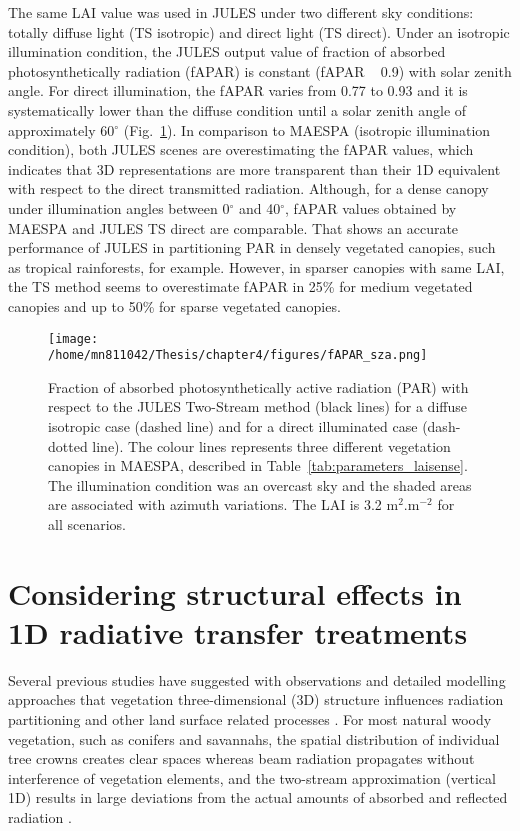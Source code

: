 The same LAI value was used in JULES under two different sky conditions: totally diffuse light (TS isotropic) and direct light (TS direct). Under an isotropic illumination condition, the JULES output value of fraction of absorbed photosynthetically radiation (fAPAR) is constant (fAPAR ~ 0.9) with solar zenith angle. For direct illumination, the fAPAR varies from 0.77 to 0.93 and it is systematically lower than the diffuse condition until a solar zenith angle of approximately 60$^{\circ}$ (Fig.~\ref{f:ts_maespa}). In comparison to MAESPA (isotropic illumination condition), both JULES scenes are overestimating the fAPAR values, which indicates that 3D representations are more transparent than their 1D equivalent with respect to the direct transmitted radiation. Although, for a dense canopy under illumination angles between 0$^{\circ}$ and 40$^{\circ}$, fAPAR values obtained by MAESPA and JULES TS direct are comparable. That shows an accurate performance of JULES in partitioning PAR in densely vegetated canopies, such as tropical rainforests, for example. However, in sparser canopies with same LAI, the TS method seems to overestimate fAPAR in 25\% for medium vegetated canopies and up to 50\% for sparse vegetated canopies. 

\begin{figure}
\centering
\texttt{[image: /home/mn811042/Thesis/chapter4/figures/fAPAR\_sza.png]}
\caption{Fraction of absorbed photosynthetically active radiation (PAR) with respect to the JULES Two-Stream method (black lines) for a diffuse isotropic case (dashed line) and for a direct illuminated case (dash-dotted line). The colour lines represents three different vegetation canopies in MAESPA, described in Table~\ref{tab:parameters_laisense}. The illumination condition was an overcast sky and the shaded areas are associated with azimuth variations. The LAI is 3.2 m$^2$.m$^{-2}$ for all scenarios.} 
\label{f:ts_maespa}
\end{figure}

\section{Considering structural effects in 1D radiative transfer treatments}
Several previous studies have suggested with observations and detailed modelling approaches that vegetation three-dimensional (3D) structure influences radiation partitioning and other land surface related processes \citep{Nilson1971,Wang1990,Chen1996,Kucharik1999,Yang2001,Yang2003,Jonckheere2004,pinty2006,Chen2008,Ni-Meister2010,Widlowski2011,Kobayashi2012,Loew2014}. For most natural woody vegetation, such as conifers and savannahs, the spatial distribution of individual tree crowns creates clear spaces whereas beam radiation propagates without interference of vegetation elements, and the two-stream approximation (vertical 1D) results in large deviations from the actual amounts of absorbed and reflected radiation \citep{Ni-Meister2010,Kobayashi2012,Loew2014}.

